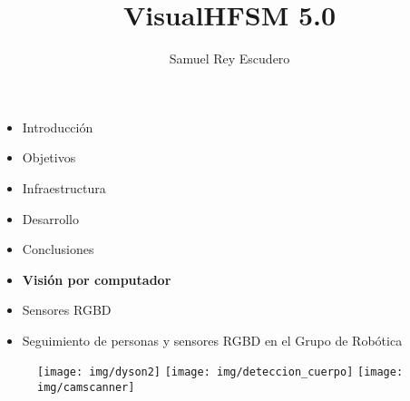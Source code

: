 \documentclass[notes,slidesec,a4]{seminar}
\title{VisualHFSM 5.0}
\author{Samuel Rey Escudero}
\begin{document}
\maketitle


\begin{hslide}
\begin{itemize}
\item Introducción 
\item Objetivos
\item Infraestructura
\item Desarrollo
\item Conclusiones
\end{itemize}
\end{hslide}


\begin{hslide}

\begin{minipage}{5cm}
\begin{center}
\begin{itemize}
\item {\bf Visión por computador}
\item Sensores RGBD
\item Seguimiento de personas y sensores RGBD en el Grupo de Robótica
\end{itemize}
\end{center}
\end{minipage} \hfill


\begin{minipage}{5cm}
\begin{center}
\begin{figure}
\texttt{[image: img/dyson2]}
\texttt{[image: img/deteccion\_cuerpo]}
\hspace{0.6cm}
\texttt{[image: img/camscanner]}
\end{figure}
\end{center}
\end{minipage}

\end{hslide}

\end{document}
